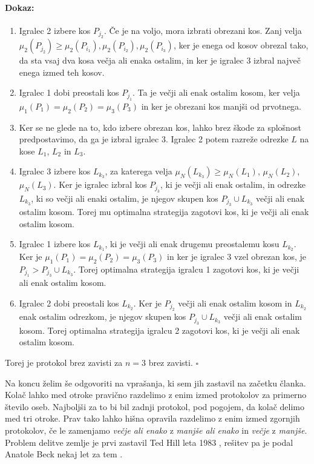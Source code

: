 \documentclass[a4paper, 12pt]{article}
\newenvironment{dokaz}{\paragraph{Dokaz:}}{\hfill$\square$\\}
\begin{document}
\begin{dokaz}
\begin{enumerate}
			\item \qquad Igralec 2 izbere kos $P_{j_2}$. Če je na voljo, mora izbrati obrezani kos. Zanj velja $\mu_2 (P_{j_2}) \geq \mu_2 (P_{i_1}), \mu_2 (P_{i_2}), \mu_2 (P_{i_3})$, ker je enega od kosov obrezal tako, da sta vsaj dva kosa večja ali enaka ostalim, in ker je igralec 3 izbral največ enega izmed teh kosov.
			
			\item \qquad Igralec 1 dobi preostali kos $P_{j_1}$. Ta je večji ali enak ostalim kosom, ker velja $\mu_1 (P_1) = \mu_2 (P_2) = \mu_3 (P_3)$ in ker je obrezani kos manjši od prvotnega.
			
			\item \qquad Ker se ne glede na to, kdo izbere obrezan kos, lahko brez škode za splošnost predpostavimo, da ga je izbral igralec 3. Igralec 2 potem razreže odrezke $L$ na kose $L_1$, $L_2$ in $L_3$.
			
			\item \qquad Igralec 3 izbere kos $L_{k_3}$, za katerega velja $\mu_N (L_{k_3}) \geq \mu_N (L_1)$, $\mu_N (L_2)$, $\mu_N (L_3)$. Ker je igralec izbral kos $P_{j_3}$, ki je večji ali enak ostalim, in odrezke $L_{k_3}$, ki so večji ali enaki ostalim, je njegov skupen kos $P_{j_3} \cup L_{k_3}$ večji ali enak ostalim kosom. Torej mu optimalna strategija zagotovi kos, ki je večji ali enak ostalim kosom.
			
			\item \qquad Igralec 1 izbere kos $L_{k_1}$, ki je večji ali enak drugemu preostalemu kosu $L_{k_2}$. Ker je $\mu_1 (P_1) = \mu_2 (P_2) = \mu_3 (P_3)$ in ker je igralec 3 vzel obrezan kos, je $P_{j_1} > P_{j_3} \cup L_{k_3}$. Torej optimalna strategija igralcu 1 zagotovi kos, ki je večji ali enak ostalim kosom.
			
			\item \qquad Igralec 2 dobi preostali kos $L_{k_2}$. Ker je $P_{j_2}$ večji ali enak ostalim kosom in $L_{k_2}$ enak ostalim odrezkom, je njegov skupen kos $P_{j_3} \cup L_{k_3}$ večji ali enak ostalim kosom. Torej optimalna strategija igralcu 2 zagotovi kos, ki je večji ali enak ostalim kosom.
			
		\end{enumerate}
		Torej je protokol brez zavisti za $n = 3$ brez zavisti.
	\end{dokaz}

	Na koncu želim še odgovoriti na vprašanja, ki sem jih zastavil na začetku članka. Kolač lahko med otroke pravično razdelimo z enim izmed protokolov za primerno število oseb. Najboljši za to bi bil zadnji protokol, pod pogojem, da kolač delimo med tri otroke. Prav tako lahko hišna opravila razdelimo z enim izmed zgornjih protokolov, če le zamenjamo \textit{večje ali enako} z \textit{manjše ali enako} in \textit{večje} z \textit{manjše}. Problem delitve zemlje je prvi zastavil Ted Hill leta 1983 \cite{hill}, rešitev pa je podal Anatole Beck \cite{beck} nekaj let za tem .
	
\end{document}
